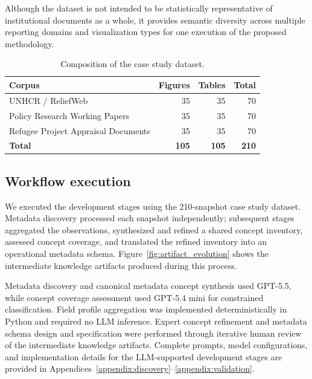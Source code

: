 \documentclass{article}
\begin{document}
Although the dataset is not intended to be statistically representative of institutional documents as a whole, it provides semantic diversity across multiple reporting domains and visualization types for one execution of the proposed methodology.

\begin{table}[!ht]
    \centering
    \caption{Composition of the case study dataset.}
    \label{tab:composition}
    \begin{tabular}{lrrr}
        \toprule
        \textbf{Corpus} & \textbf{Figures} & \textbf{Tables} & \textbf{Total} \\
        \midrule
        UNHCR / ReliefWeb & 35 & 35 & 70 \\
        Policy Research Working Papers & 35 & 35 & 70 \\
        Refugee Project Appraisal Documents & 35 & 35 & 70 \\
        \midrule
        \textbf{Total} & \textbf{105} & \textbf{105} & \textbf{210} \\
        \bottomrule
    \end{tabular}
\end{table}

\subsection{Workflow execution}

We executed the development stages using the 210-snapshot case study dataset. Metadata discovery processed each snapshot independently; subsequent stages aggregated the observations, synthesized and refined a shared concept inventory, assessed concept coverage, and translated the refined inventory into an operational metadata schema. Figure~\ref{fig:artifact_evolution} shows the intermediate knowledge artifacts produced during this process.

Metadata discovery and canonical metadata concept synthesis used GPT-5.5, while concept coverage assessment used GPT-5.4 mini for constrained classification. Field profile aggregation was implemented deterministically in Python and required no LLM inference. Expert concept refinement and metadata schema design and specification were performed through iterative human review of the intermediate knowledge artifacts. Complete prompts, model configurations, and implementation details for the LLM-supported development stages are provided in Appendices~\ref{appendix:discovery}--\ref{appendix:validation}.
\end{document}
